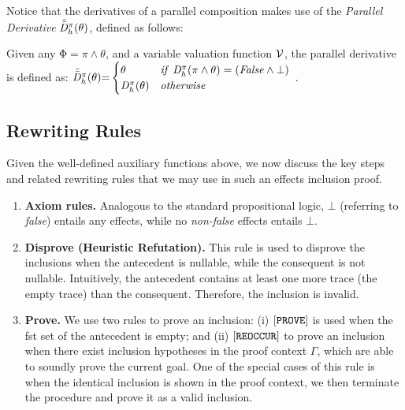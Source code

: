 \documentclass[acmsmall,10pt,review]{acmart}
\newcommand{\env}{\code{\mathcal{V}}}
\newcommand{\es}{\theta}
\newcommand{\effect}{{\ensuremath{\mathrm{\Phi}}}}
\newcommand{\code}[1]{{\tt{\ensuremath{\m{#1}}}}}
\newcommand{\codeme}[1]{{\tt{\ensuremath{#1}}}}
\newcommand{\m}{\mathit}
\begin{document}
{Notice that the derivatives of a parallel composition makes use of the \emph{Parallel Derivative} \code{\Bar{\Bar{D}}^{\pi}_{h}(\es)}, defined as follows: 
  \begin{definition}\label{Derivative_maybe}
    Given any \code{\effect {=} \pi \wedge \es}, and a variable valuation function \code{\env}, 
    the parallel derivative is defined as: {
      \code{\Bar{\Bar{D}}^{\pi}_{h}( \es) {=}
      \begin{cases}
            \code{ \es} & \code{if\ D^{\pi}_{h}(\pi \wedge \es) = (False \wedge \bot )}\\
            \code{D^{\pi}_{h}( \es)} & \code{otherwise}
          \end{cases} }
    }.
  \end{definition}

\subsection{Rewriting Rules}
\label{InferenceRules}
Given the well-defined auxiliary functions above, we now discuss the key steps and related rewriting rules that we may use in such an effects inclusion proof.  


\begin{enumerate}
\item 
\textbf{Axiom rules.}
\label{Base}
Analogous to  the standard propositional logic, \code{\bot } (referring to \textit{false}) entails any effects, while no \textit{non-false} effects entails \code{\bot }.


\item 
\textbf{Disprove (Heuristic Refutation).}
\label{Refutation}
This rule is used to disprove the inclusions when the antecedent is nullable, while the consequent is not nullable. Intuitively, the antecedent contains at least one more trace (the empty trace) than the consequent. Therefore, the inclusion is invalid. 

\vspace{-4mm}


\item 
\textbf{Prove.}
\label{Prove}
We use two rules to prove an inclusion: (i) $\codeme{[PROVE]}$ is 
used when the fst set of the antecedent is empty; and 
(ii) $\codeme{[REOCCUR]}$ to prove an inclusion
when there exist inclusion hypotheses 
in the proof context $\m{\Gamma}$, which are able to 
soundly prove the current goal. One of the special cases of 
this rule is when the identical inclusion is shown in the proof 
context, we then terminate the procedure and prove it as a valid 
inclusion. 



\end{enumerate}}
\end{document}
